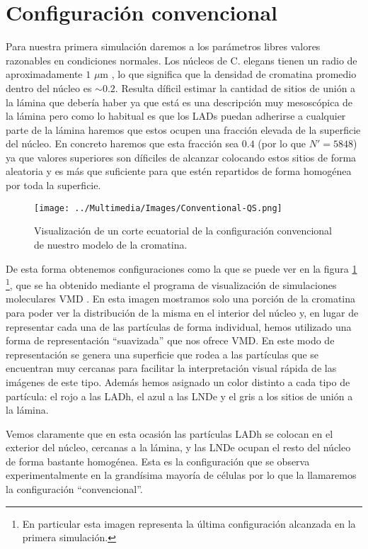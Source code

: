 \section{Configuración convencional}

Para nuestra primera simulación daremos a los parámetros libres valores razonables en condiciones normales. Los núcleos de C. elegans tienen un radio de aproximadamente $1$ $\mu$m \cite{Ikegami2010}, lo que significa que la densidad de cromatina promedio dentro del núcleo es $\sim 0.2$. Resulta díficil estimar la cantidad de sitios de unión a la lámina que debería haber ya que está es una descripción muy mesoscópica de la lámina pero como lo habitual es que los LADs puedan adherirse a cualquier parte de la lámina haremos que estos ocupen una fracción elevada de la superficie del núcleo. En concreto haremos que esta fracción sea $0.4$ (por lo que $N'=5848$) ya que valores superiores son díficiles de alcanzar colocando estos sitios de forma aleatoria y es más que suficiente para que estén repartidos de forma homogénea por toda la superficie.

\begin{figure}[t]
    \centering
    \texttt{[image: ../Multimedia/Images/Conventional-QS.png]}
    \caption{Visualización de un corte ecuatorial de la configuración convencional de nuestro modelo de la cromatina.}
    \label{fig:vmd_QS_image_c}
\end{figure}

De esta forma obtenemos configuraciones como la que se puede ver en la figura \ref{fig:vmd_QS_image_c} \footnote{En particular esta imagen representa la última configuración alcanzada en la primera simulación.}, que se ha obtenido mediante el programa de visualización de simulaciones moleculares VMD \cite{Humphrey96}. En esta imagen mostramos solo una porción de la cromatina para poder ver la distribución de la misma en el interior del núcleo y, en lugar de representar cada una de las partículas de forma individual, hemos utilizado una forma de representación ``suavizada'' que nos ofrece VMD. En este modo de representación se genera una superficie que rodea a las partículas que se encuentran muy cercanas para facilitar la interpretación visual rápida de las imágenes de este tipo. Además hemos asignado un color distinto a cada tipo de partícula: el rojo a las LADh, el azul a las LNDe y el gris a los sitios de unión a la lámina.

Vemos claramente que en esta ocasión las partículas LADh se colocan en el exterior del núcleo, cercanas a la lámina, y las LNDe ocupan el resto del núcleo de forma bastante homogénea. Esta es la configuración que se observa experimentalmente en la grandísima mayoría de células \cite{Camara2023} por lo que la llamaremos la configuración ``convencional''.

